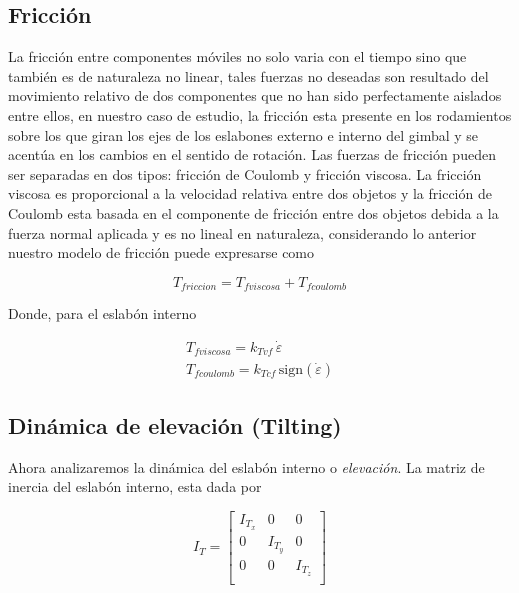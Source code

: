\subsection{Fricci\'{o}n}\label{sec:friccion}

La fricci\'{o}n entre componentes m\'{o}viles no solo varia con el tiempo sino que tambi\'{e}n es de naturaleza no linear, tales fuerzas no deseadas son resultado del movimiento relativo de dos componentes que no han sido perfectamente aislados entre ellos, en nuestro caso de estudio, la fricci\'{o}n esta presente en los rodamientos sobre los que giran los ejes de los eslabones externo e interno del gimbal y se acent\'{u}a en los cambios en el sentido de rotaci\'{o}n. 
Las fuerzas de fricci\'{o}n pueden ser separadas en dos tipos: fricci\'{o}n de Coulomb y fricci\'{o}n viscosa. La fricci\'{o}n viscosa es proporcional a la velocidad relativa entre dos objetos y la fricci\'{o}n de Coulomb esta basada en el componente de fricci\'{o}n entre dos objetos debida a la fuerza normal aplicada y es no lineal en naturaleza, considerando lo anterior nuestro modelo de fricci\'{o}n puede expresarse como

\begin{equation}
T_{friccion}=T_{fviscosa}+T_{fcoulomb}
\end{equation}

Donde, para el eslab\'{o}n interno

\begin{equation*}
\begin{array}{c}
T_{fviscosa}=k_{Tvf} \, \dot{\varepsilon }\\

T_{fcoulomb}=k_{Tcf} \, \mathrm{sign}\left( \dot{\varepsilon} \right)
\end{array}
\end{equation*}
    

\subsection{Din\'{a}mica de elevaci\'{o}n (Tilting)}

Ahora analizaremos la din\'{a}mica del eslab\'{o}n interno o \textit{elevaci\'{o}n}. La matriz de inercia del eslab\'{o}n interno, esta dada por

\begin{equation}
I_T = \left[ 
\begin{array}{ccc}
I_{T_x}  &      0   &   0 \\
   0     &  I_{T_y} &   0 \\
   0     &      0   & I_{T_z}\\
\end{array} \right]
\end{equation}

